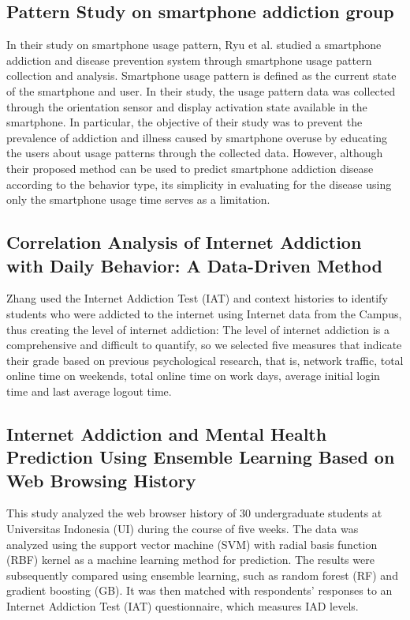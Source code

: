 \documentclass[conference]{IEEEtran}
\begin{document}
\subsection{Pattern Study on smartphone addiction group}
In their study on smartphone usage pattern, Ryu et al.\cite{b10} studied a smartphone addiction and disease prevention system through smartphone usage pattern collection and analysis. Smartphone usage pattern is defined as the current state of the smartphone and user. In their study, the usage pattern data was collected through the orientation sensor and display activation state available in the smartphone. In particular, the objective of their study was to prevent the prevalence of addiction and illness caused by smartphone overuse by educating the users about usage patterns through the collected data. However, although their proposed method can be used to predict smartphone addiction disease according to the behavior type, its simplicity in evaluating for the disease using only the smartphone usage time serves as a limitation.

\subsection{Correlation Analysis of Internet Addiction with Daily Behavior: A Data-Driven Method}

Zhang \cite{b9} used the Internet Addiction Test (IAT) and context histories to identify students who were addicted to the internet using Internet data from the Campus, thus creating the level of internet addiction: The level of internet addiction is a comprehensive and difficult to quantify, so we selected five measures that indicate their grade based on previous psychological research, that is, network traffic, total online time on weekends, total online time on work days, average initial login time and last average logout time.

\subsection{Internet Addiction and Mental Health Prediction Using Ensemble Learning Based on Web Browsing History}

This study \cite{b11} analyzed the web browser history of 30 undergraduate students at Universitas Indonesia (UI) during the course of five weeks. The data was analyzed using the support vector machine (SVM) with radial basis function (RBF) kernel as a machine learning method for prediction. The results were subsequently compared using ensemble learning, such as random forest (RF) and gradient boosting (GB). It was then matched with respondents’ responses to an Internet Addiction Test (IAT) questionnaire, which measures IAD levels. 
\end{document}
